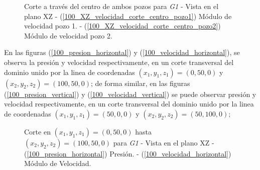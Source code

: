\documentclass[10pt,a4paper,final]{article}
\begin{document}
\begin{figure}[H]
    \caption{Corte a través del centro de ambos pozos para \emph{G1} - Vista en el plano XZ - (\ref{100_XZ_velocidad_corte_centro_pozo1}) Módulo de velocidad pozo 1. - (\ref{100_XZ_velocidad_corte_centro_pozo2}) Módulo de velocidad pozo 2.}
   \label{100_XZ_velocidad_corte_centro_pozos}                %
\end{figure}
%
En las figuras (\ref{100_presion_horizontal}) y (\ref{100_velocidad_horizontal}), se observa la presión y velocidad respectivamente, en un corte transversal del dominio unido por la linea de coordenadas $(x_1,y_1,z_1)=(0,50,0)$ y $(x_2,y_2,z_2)=(100,50,0)$; de forma similar, en las figuras (\ref{100_presion_vertical}) y (\ref{100_velocidad_vertical}) se puede observar presión y velocidad respectivamente, en un corte transversal del dominio unido por la linea de coordenadas $(x_1,y_1,z_1)=(50,0,0)$ y $(x_2,y_2,z_2)=(50,100,0)$;
\begin{figure}[H]
   \centering
   \hspace{0.1\linewidth}
    \caption{Corte en $(x_1,y_1,z_1)=(0,50,0)$ hasta $(x_2,y_2,z_2)=(100,50,0)$ para \emph{G1} - Vista en el plano XZ - (\ref{100_presion_horizontal}) Presión. - (\ref{100_velocidad_horizontal}) Módulo de Velocidad.}
   \label{100_velocidad_presion_horizontal}                %
\end{figure}
\end{document}
